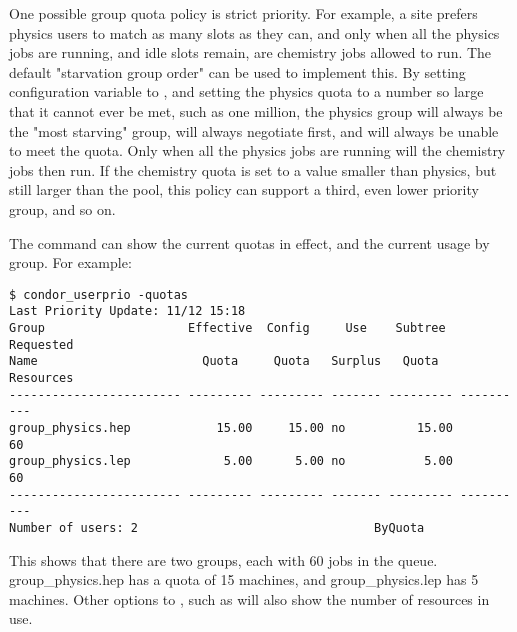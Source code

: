 One possible group quota policy is strict priority.
For example, a site prefers physics users to match as many slots as they can,
and only when all the physics jobs are running, 
and idle slots remain,
are chemistry jobs allowed to run.  
The default "starvation group order" can be used to implement this.  
By setting configuration variable 
 to ,
and setting the physics quota to a number so large that it cannot ever be met,
such as one million, 
the physics group will always be the "most starving" group,
will always negotiate first, 
and will always be unable to meet the quota.  
Only when all the physics jobs are running
will the chemistry jobs then run.  If the chemistry quota is set to a value smaller than physics, but still larger than the
pool, this policy can support a third, even lower priority group, and so on.

The  command can show the current quotas in effect, 
and the current usage by group.
For example:
\begin{verbatim}
$ condor_userprio -quotas
Last Priority Update: 11/12 15:18
Group                    Effective  Config     Use    Subtree  Requested 
Name                       Quota     Quota   Surplus   Quota   Resources 
------------------------ --------- --------- ------- --------- ----------
group_physics.hep            15.00     15.00 no          15.00         60
group_physics.lep             5.00      5.00 no           5.00         60
------------------------ --------- --------- ------- --------- ----------
Number of users: 2                                 ByQuota                     
\end{verbatim}

This shows that there are two groups, each with 60 jobs in the queue.  
group\_physics.hep has a quota of 15 machines, 
and group\_physics.lep has 5 machines.  
Other options to ,
such as  will also show the number of resources in use.

